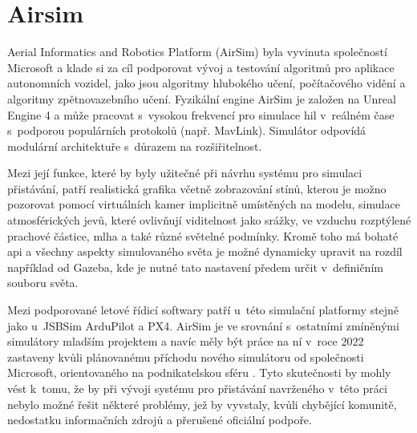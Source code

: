     \section{Airsim} \label{sec:airsim}
        Aerial Informatics and Robotics Platform (AirSim) byla vyvinuta společností Microsoft a klade si za cíl podporovat vývoj a testování algoritmů pro aplikace autonomních vozidel, jako jsou algoritmy hlubokého učení, počítačového vidění a algoritmy zpětnovazebního učení. Fyzikální engine AirSim je založen na Unreal Engine 4 a může pracovat s~vysokou frekvencí pro simulace \acrshort{hil} v~reálném čase s~podporou populárních protokolů (např. MavLink). Simulátor odpovídá modulární architektuře s~důrazem na rozšiřitelnost. \cite{Ebeid2018}

        Mezi její funkce, které by byly užitečné při návrhu systému pro simulaci přistávání, patří realistická grafika včetně zobrazování stínů, kterou je možno pozorovat pomocí virtuálních kamer implicitně umístěných na modelu, simulace atmosférických jevů, které ovlivňují viditelnost jako srážky, ve vzduchu rozptýlené prachové částice, mlha a také různé světelné podmínky. Kromě toho má bohaté \acrshort{api} a všechny aspekty simulovaného světa je možné dynamicky upravit na rozdíl například od Gazeba, kde je nutné tato nastavení předem určit v~definičním souboru světa. \cite{airsim}

        Mezi podporované letové řídicí softwary patří u~této simulační platformy stejně jako u~JSBSim ArduPilot a PX4. AirSim je ve srovnání s~ostatními zmíněnými simulátory mladším projektem a navíc měly být práce na ní v~roce 2022 zastaveny kvůli plánovanému příchodu nového simulátoru od společnosti Microsoft, orientovaného na podnikatelskou sféru \cite{airsimweb}. Tyto skutečnosti by mohly vést k~tomu, že by při vývoji systému pro přistávání navrženého v~této práci nebylo možné řešit některé problémy, jež by vyvstaly, kvůli chybějící komunitě, nedostatku informačních zdrojů a přerušené oficiální podpoře.